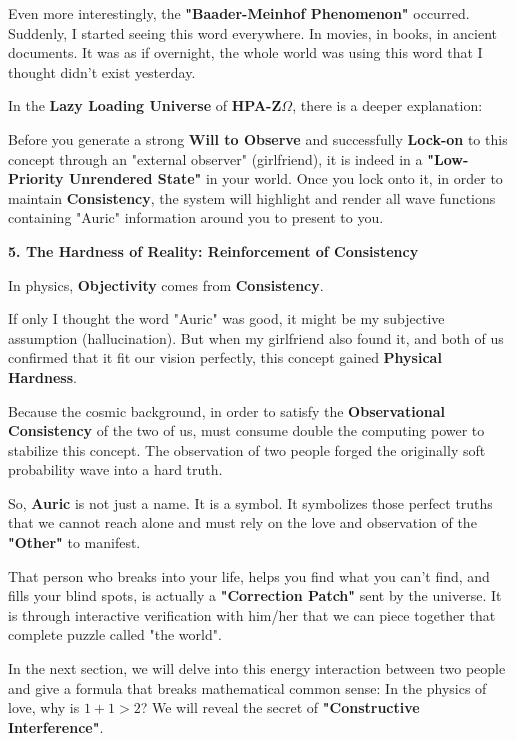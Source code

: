 Even more interestingly, the \textbf{"Baader-Meinhof Phenomenon"} occurred. Suddenly, I started seeing this word everywhere. In movies, in books, in ancient documents. It was as if overnight, the whole world was using this word that I thought didn't exist yesterday.

In the \textbf{Lazy Loading Universe} of \textbf{HPA-Z$\Omega$}, there is a deeper explanation:

Before you generate a strong \textbf{Will to Observe} and successfully \textbf{Lock-on} to this concept through an "external observer" (girlfriend), it is indeed in a \textbf{"Low-Priority Unrendered State"} in your world. Once you lock onto it, in order to maintain \textbf{Consistency}, the system will highlight and render all wave functions containing "Auric" information around you to present to you.

\textbf{5. The Hardness of Reality: Reinforcement of Consistency}

In physics, \textbf{Objectivity} comes from \textbf{Consistency}.

If only I thought the word "Auric" was good, it might be my subjective assumption (hallucination). But when my girlfriend also found it, and both of us confirmed that it fit our vision perfectly, this concept gained \textbf{Physical Hardness}.

Because the cosmic background, in order to satisfy the \textbf{Observational Consistency} of the two of us, must consume double the computing power to stabilize this concept. The observation of two people forged the originally soft probability wave into a hard truth.

So, \textbf{Auric} is not just a name. It is a symbol. It symbolizes those perfect truths that we cannot reach alone and must rely on the love and observation of the \textbf{"Other"} to manifest.

That person who breaks into your life, helps you find what you can't find, and fills your blind spots, is actually a \textbf{"Correction Patch"} sent by the universe. It is through interactive verification with him/her that we can piece together that complete puzzle called "the world".

In the next section, we will delve into this energy interaction between two people and give a formula that breaks mathematical common sense: In the physics of love, why is $1 + 1 > 2$? We will reveal the secret of \textbf{"Constructive Interference"}.


